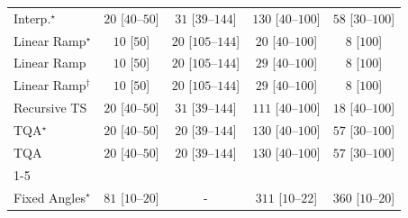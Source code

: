 \begin{tabular}{l|cccc|}
Interp.$^\star$ & {\cellcolor[HTML]{F5FBF2}} \color[HTML]{000000} $20$ [$40$--$50$] & {\cellcolor[HTML]{F3FAF0}} \color[HTML]{000000} $31$ [$39$--$144$] & {\cellcolor[HTML]{DFF3DA}} \color[HTML]{000000} $130$ [$40$--$100$] & {\cellcolor[HTML]{EFF9EB}} \color[HTML]{000000} $58$ [$30$--$100$] \\
Linear Ramp$^\star$ & {\cellcolor[HTML]{F7FCF5}} \color[HTML]{000000} $10$ [$50$] & {\cellcolor[HTML]{F5FBF2}} \color[HTML]{000000} $20$ [$105$--$144$] & {\cellcolor[HTML]{F5FBF2}} \color[HTML]{000000} $20$ [$40$--$100$] & {\cellcolor[HTML]{F7FCF5}} \color[HTML]{000000} $8$ [$100$] \\
Linear Ramp & {\cellcolor[HTML]{F7FCF5}} \color[HTML]{000000} $10$ [$50$] & {\cellcolor[HTML]{F5FBF2}} \color[HTML]{000000} $20$ [$105$--$144$] & {\cellcolor[HTML]{F4FBF1}} \color[HTML]{000000} $29$ [$40$--$100$] & {\cellcolor[HTML]{F7FCF5}} \color[HTML]{000000} $8$ [$100$] \\
Linear Ramp$^\dagger$ & {\cellcolor[HTML]{F7FCF5}} \color[HTML]{000000} $10$ [$50$] & {\cellcolor[HTML]{F5FBF2}} \color[HTML]{000000} $20$ [$105$--$144$] & {\cellcolor[HTML]{F4FBF1}} \color[HTML]{000000} $29$ [$40$--$100$] & {\cellcolor[HTML]{F7FCF5}} \color[HTML]{000000} $8$ [$100$] \\
Recursive TS & {\cellcolor[HTML]{F5FBF2}} \color[HTML]{000000} $20$ [$40$--$50$] & {\cellcolor[HTML]{F3FAF0}} \color[HTML]{000000} $31$ [$39$--$144$] & {\cellcolor[HTML]{E5F5E0}} \color[HTML]{000000} $111$ [$40$--$100$] & {\cellcolor[HTML]{F5FBF3}} \color[HTML]{000000} $18$ [$40$--$100$] \\
TQA$^\star$ & {\cellcolor[HTML]{F5FBF2}} \color[HTML]{000000} $20$ [$40$--$50$] & {\cellcolor[HTML]{F5FBF2}} \color[HTML]{000000} $20$ [$39$--$144$] & {\cellcolor[HTML]{DFF3DA}} \color[HTML]{000000} $130$ [$40$--$100$] & {\cellcolor[HTML]{EFF9EB}} \color[HTML]{000000} $57$ [$30$--$100$] \\
TQA & {\cellcolor[HTML]{F5FBF2}} \color[HTML]{000000} $20$ [$40$--$50$] & {\cellcolor[HTML]{F5FBF2}} \color[HTML]{000000} $20$ [$39$--$144$] & {\cellcolor[HTML]{DFF3DA}} \color[HTML]{000000} $130$ [$40$--$100$] & {\cellcolor[HTML]{EFF9EB}} \color[HTML]{000000} $57$ [$30$--$100$] \\
\cline{1-5}
\multicolumn{5}{c}{\rule{0pt}{8pt}SV} \\
\midrule
Fixed Angles$^\star$ & {\cellcolor[HTML]{EAF7E6}} \color[HTML]{000000} $81$ [$10$--$20$] & {\cellcolor[HTML]{000000}} \color[HTML]{F1F1F1} {\cellcolor{white}} \color{black} - & {\cellcolor[HTML]{A3DA9D}} \color[HTML]{000000} $311$ [$10$--$22$] & {\cellcolor[HTML]{8DD08A}} \color[HTML]{000000} $360$ [$10$--$20$] \\

\end{tabular}

